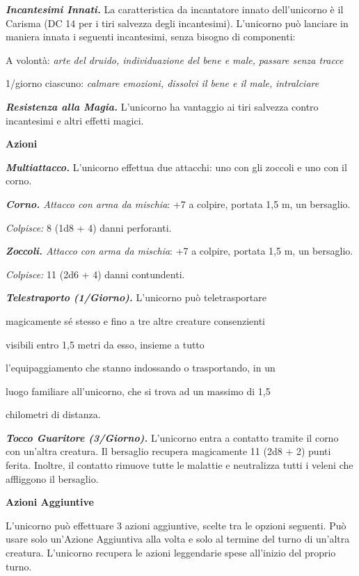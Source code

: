 \begin{multicols}{2}
\emph{\textbf{Incantesimi Innati.}} La caratteristica da incantatore
innato dell'unicorno è il Carisma (DC 14 per i tiri salvezza degli
incantesimi). L'unicorno può lanciare in maniera innata i seguenti
incantesimi, senza bisogno di componenti:

A volontà: \emph{arte del druido, individuazione del bene e male,}
\emph{passare senza tracce}

1/giorno ciascuno: \emph{calmare emozioni, dissolvi il bene e il male,}
\emph{intralciare}

\emph{\textbf{Resistenza alla Magia.}} L'unicorno ha vantaggio ai tiri
salvezza contro incantesimi e altri effetti magici.

\textbf{Azioni}

\emph{\textbf{Multiattacco.}} L'unicorno effettua due attacchi: uno con
gli zoccoli e uno con il corno.

\emph{\textbf{Corno.} Attacco con arma da mischia}: +7 a colpire,
portata 1,5 m, un bersaglio.

\emph{Colpisce:} 8 (1d8 + 4) danni perforanti.

\emph{\textbf{Zoccoli.} Attacco con arma da mischia}: +7 a colpire,
portata 1,5 m, un bersaglio.

\emph{Colpisce:} 11 (2d6 + 4) danni contundenti.

\emph{\textbf{Telestraporto (1/Giorno).}} L'unicorno può teletrasportare

magicamente sé stesso e fino a tre altre creature consenzienti

visibili entro 1,5 metri da esso, insieme a tutto

l'equipaggiamento che stanno indossando o trasportando, in un

luogo familiare all'unicorno, che si trova ad un massimo di 1,5

chilometri di distanza.

\emph{\textbf{Tocco Guaritore (3/Giorno).}} L'unicorno entra a contatto
tramite il corno con un'altra creatura. Il bersaglio recupera
magicamente 11 (2d8 + 2) punti ferita. Inoltre, il contatto rimuove
tutte le malattie e neutralizza tutti i veleni che affliggono il
bersaglio.

\textbf{Azioni Aggiuntive}

L'unicorno può effettuare 3 azioni aggiuntive, scelte tra le opzioni
seguenti. Può usare solo un'Azione Aggiuntiva alla volta e solo al
termine del turno di un'altra creatura. L'unicorno recupera le azioni
leggendarie spese all'inizio del proprio turno.


\end{multicols}
